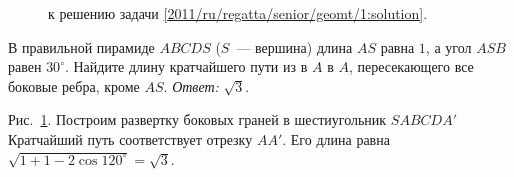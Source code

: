 \ifsolution
\begin{figure}\centering
    \caption{к решению задачи \ref{2011/ru/regatta/senior/geomt/1:solution}.}
    \label{2011/ru/regatta/senior/geomt/1:solution:fig}
\end{figure}%
\fi %

\problem
В правильной пирамиде $ABCDS$ ($S$~--- вершина) длина $AS$ равна $1$, а угол
$ASB$ равен $30^\circ$.
Найдите длину кратчайшего пути из в $A$ в $A$, пересекающего все боковые ребра,
кроме $AS$.
\solution
\label{2011/ru/regatta/senior/geomt/1:solution}%
\emph{Ответ:} $\sqrt{3}$.
\par
Рис.~\ref{2011/ru/regatta/senior/geomt/1:solution:fig}.
Построим развертку боковых граней в шестиугольник $SABCDA'$
Кратчайший путь соответствует отрезку $AA'$.
Его длина равна $\sqrt{1 + 1 - 2 \cos 120^\circ} = \sqrt{3}$.
\endproblem
